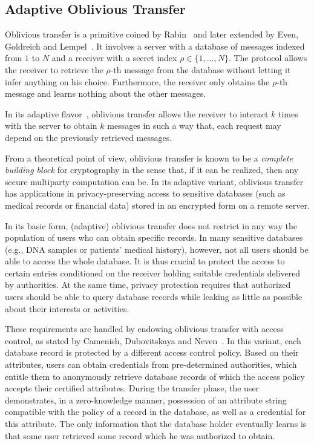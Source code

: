 \subsection{Adaptive Oblivious Transfer}

Oblivious transfer is a primitive coined by Rabin~\cite{Rab81} and later extended by Even, Goldreich and Lempel~\cite{EGL85}.
It involves a server with a database of messages indexed from $1$ to $N$ and a receiver with a secret index $\rho \in \{1,\ldots,N\}$.
The protocol allows the receiver to retrieve the $\rho$-th message from the database without letting it infer anything on his choice.
Furthermore, the receiver only obtains the $\rho$-th message and learns nothing about the other messages.

In its adaptive flavor~\cite{NP99}, oblivious transfer allows the receiver to interact $k$ times with the server to obtain $k$ messages in such a way that, each request may depend on the previously retrieved messages.

From a theoretical point of view, oblivious transfer is known to be a \textit{complete building block} for cryptography in the sense that, if it can be realized, then any secure multiparty computation can be.
In its adaptive variant, oblivious transfer has applications in privacy-preserving access to sensitive databases (such as medical records or financial data) stored in an encrypted form on a remote server.

In its basic form, (adaptive) oblivious transfer does not restrict in any way the population of users who can obtain specific records.
In many sensitive databases (e.g., DNA samples or patients' medical history), however, not all users should be able to access the whole database.
It is thus crucial to protect the access to certain entries conditioned on the receiver holding suitable credentials delivered by authorities.
At the same time, privacy protection requires that authorized users should be able to query database records while leaking as little as possible about their interests or activities.

These requirements are handled by endowing oblivious transfer with access control, as stated by Camenish, Dubovitskaya and Neven~\cite{CDN09}.
In this variant, each database record is protected by a different access control policy.
Based on their attributes, users can obtain credentials from pre-determined authorities, which entitle them to anonymously retrieve database records of which the access policy accepts their certified attributes.
During the transfer phase, the user demonstrates, in a zero-knowledge manner, possession of an attribute string compatible with the policy of a record in the database, as well as a credential for this attribute.
The only information that the database holder eventually learns is that some user retrieved some record which he was authorized to obtain.

